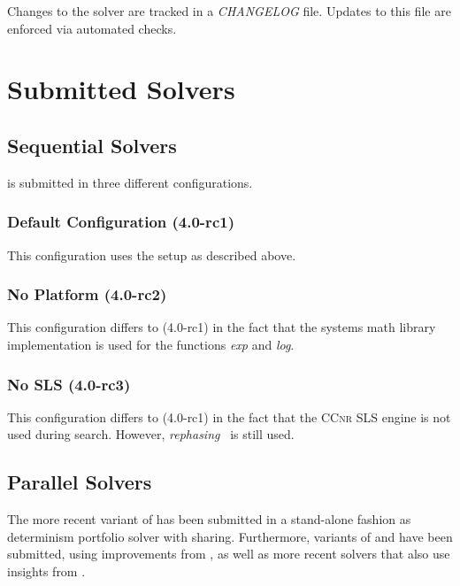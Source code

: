 \documentclass[conference]{IEEEtran}
\begin{document}
Changes to the solver are tracked in a \emph{CHANGELOG} file.
Updates to this file are enforced via automated checks.

\section{Submitted Solvers}



\subsection{Sequential Solvers}

\mergesat is submitted in three different configurations.

\subsubsection{Default Configuration (4.0-rc1)}

This configuration uses the setup as described above.

\subsubsection{No Platform (4.0-rc2)}

This configuration differs to (4.0-rc1) in the fact that the systems math library implementation is used for the functions \emph{exp} and \emph{log}.

\subsubsection{No SLS (4.0-rc3)}

This configuration differs to (4.0-rc1) in the fact that the \textsc{CCnr} SLS engine is not used during search. However, \emph{rephasing}~\cite{kissat} is still used.

\subsection{Parallel Solvers}

The more recent variant of \mergesat has been submitted in a stand-alone fashion as determinism portfolio solver with sharing.
Furthermore, variants of \hordesat and \mallob have been submitted, using improvements from \mergesat, as well as more recent solvers that also use insights from \mergesat.
\end{document}
